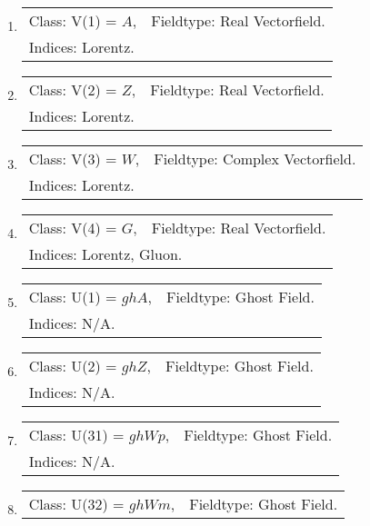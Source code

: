 \documentclass[11pt]{article}
\begin{document}
\begin{enumerate}
\item 
\begin{tabular}{ll}
Class: V(1) = $ A $, &  Fieldtype: Real Vectorfield.\\ 
\multicolumn{2}{l}{Indices: Lorentz.}\\ 
\end{tabular}
\item 
\begin{tabular}{ll}
Class: V(2) = $ Z $, &  Fieldtype: Real Vectorfield.\\ 
\multicolumn{2}{l}{Indices: Lorentz.}\\ 
\end{tabular}
\item 
\begin{tabular}{ll}
Class: V(3) = $ W $, &  Fieldtype: Complex Vectorfield.\\ 
\multicolumn{2}{l}{Indices: Lorentz.}\\ 
\end{tabular}
\item 
\begin{tabular}{ll}
Class: V(4) = $ G $, &  Fieldtype: Real Vectorfield.\\ 
\multicolumn{2}{l}{Indices: Lorentz, Gluon.}\\ 
\end{tabular}
\item 
\begin{tabular}{ll}
Class: U(1) = $ ghA $, &  Fieldtype: Ghost Field.\\ 
\multicolumn{2}{l}{Indices: N/A.}\\ 
\end{tabular}
\item 
\begin{tabular}{ll}
Class: U(2) = $ ghZ $, &  Fieldtype: Ghost Field.\\ 
\multicolumn{2}{l}{Indices: N/A.}\\ 
\end{tabular}
\item 
\begin{tabular}{ll}
Class: U(31) = $ ghWp $, &  Fieldtype: Ghost Field.\\ 
\multicolumn{2}{l}{Indices: N/A.}\\ 
\end{tabular}
\item 
\begin{tabular}{ll}
Class: U(32) = $ ghWm $, &  Fieldtype: Ghost Field.\\ 

\end{tabular}
\end{enumerate}
\end{document}
